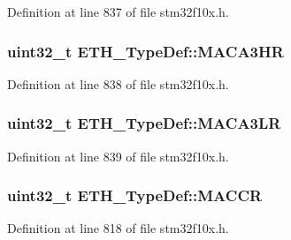Definition at line 837 of file stm32f10x.\+h.

\subsubsection[{\texorpdfstring{M\+A\+C\+A3\+HR}{MACA3HR}}]{ {\bf uint32\+\_\+t} E\+T\+H\+\_\+\+Type\+Def\+::\+M\+A\+C\+A3\+HR}\hypertarget{struct_e_t_h___type_def_ad4dd976fada7085d87aa017f160e70d4}{}\label{struct_e_t_h___type_def_ad4dd976fada7085d87aa017f160e70d4}


Definition at line 838 of file stm32f10x.\+h.

\subsubsection[{\texorpdfstring{M\+A\+C\+A3\+LR}{MACA3LR}}]{ {\bf uint32\+\_\+t} E\+T\+H\+\_\+\+Type\+Def\+::\+M\+A\+C\+A3\+LR}\hypertarget{struct_e_t_h___type_def_af31f33c1487ae0ee89ac427d9f0f037d}{}\label{struct_e_t_h___type_def_af31f33c1487ae0ee89ac427d9f0f037d}


Definition at line 839 of file stm32f10x.\+h.

\subsubsection[{\texorpdfstring{M\+A\+C\+CR}{MACCR}}]{ {\bf uint32\+\_\+t} E\+T\+H\+\_\+\+Type\+Def\+::\+M\+A\+C\+CR}\hypertarget{struct_e_t_h___type_def_a68d7e7c68b5b8adcf7b2b96bc1eea7d9}{}\label{struct_e_t_h___type_def_a68d7e7c68b5b8adcf7b2b96bc1eea7d9}


Definition at line 818 of file stm32f10x.\+h.

